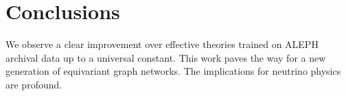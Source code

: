 \section{Conclusions}\label{sec:conclusions}

We observe a clear improvement over effective theories trained on ALEPH
archival data up to a universal constant. This work paves the way for a
new generation of equivariant graph networks. The implications for
neutrino physics are profound.

